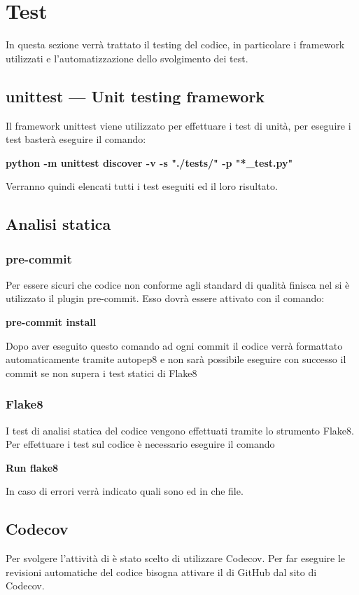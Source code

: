 \section{Test}

In questa sezione verrà trattato il testing del codice, in particolare i framework utilizzati e l'automatizzazione dello svolgimento dei test.

\subsection{unittest — Unit testing framework} \label{sec:unittest}
Il framework unittest viene utilizzato per effettuare i test di unità, per eseguire i test basterà eseguire il comando: \newline{}
\centerline{ \textbf{python -m unittest discover -v -s "./tests/" -p "*\_test.py"}}\newline{}
Verranno quindi elencati tutti i test eseguiti ed il loro risultato.

\subsection{Analisi statica}
\subsubsection{pre-commit}
Per essere sicuri che codice non conforme agli standard di qualità finisca nel  si è utilizzato il plugin pre-commit. Esso dovrà essere attivato con il comando: \newline{}
\centerline{\textbf{pre-commit install}}\newline{}
Dopo aver eseguito questo comando ad ogni commit il codice verrà formattato automaticamente tramite autopep8 e non sarà possibile eseguire con successo il commit se non supera i test statici di Flake8
\subsubsection{Flake8}
I test di analisi statica del codice vengono effettuati tramite lo strumento Flake8. Per effettuare i test sul codice è necessario eseguire il comando\newline{}
\centerline{\textbf{Run flake8}}\newline{}
In caso di errori verrà indicato quali sono ed in che file.

\subsection{Codecov}
Per svolgere l'attività di  è stato scelto di utilizzare Codecov. Per far eseguire le revisioni automatiche del codice bisogna attivare il  di GitHub dal sito di Codecov.

